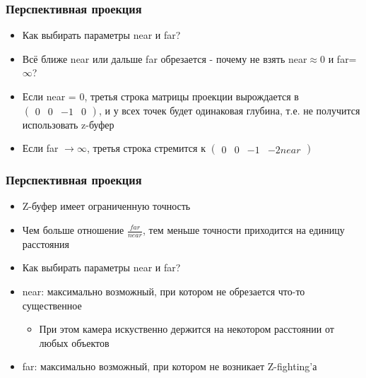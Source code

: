 \documentclass{beamer}
\begin{document}
\begin{frame}[fragile]
\frametitle{Перспективная проекция}
\begin{itemize}
\item Как выбирать параметры near и far?
\pause
\item Всё ближе near или дальше far обрезается - почему не взять near\begin{math}\approx 0\end{math} и far=\begin{math}\infty\end{math}?
\pause
\item Если near = 0, третья строка матрицы проекции вырождается в \begin{math}\begin{pmatrix}0 & 0 & -1 & 0\end{pmatrix}\end{math}, и у всех точек будет одинаковая глубина, т.е. не получится использовать z-буфер
\pause
\item Если far \begin{math}\rightarrow\infty\end{math}, третья строка стремится к \begin{math}\begin{pmatrix}0 & 0 & -1 & -2near\end{pmatrix}\end{math}
\end{itemize}
\end{frame}

\begin{frame}[fragile]
\frametitle{Перспективная проекция}
\begin{itemize}
\item Z-буфер имеет ограниченную точность
\pause
\item Чем больше отношение \begin{math}\frac{far}{near}\end{math}, тем меньше точности приходится на единицу расстояния
\pause
\item Как выбирать параметры near и far?
\pause
\item near: максимально возможный, при котором не обрезается что-то существенное
\begin{itemize}
\item При этом камера искуственно держится на некотором расстоянии от любых объектов
\end{itemize}
\pause
\item far: максимально возможный, при котором не возникает Z-fighting'а
\end{itemize}
\end{frame}
\end{document}
